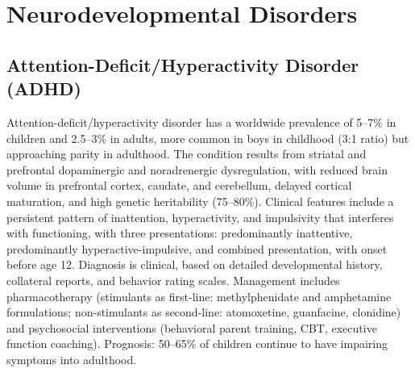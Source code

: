 \section{Neurodevelopmental Disorders}








\label{sec:Neurodevelopmental Disorders}

\subsection{Attention-Deficit/Hyperactivity Disorder (ADHD)}
\label{sec:Attention-Deficit/Hyperactivity Disorder (ADHD)}
Attention-deficit/hyperactivity disorder has a worldwide prevalence of 5--7\% in children and 2.5--3\% in adults, more common in boys in childhood (3:1 ratio) but approaching parity in adulthood. The condition results from striatal and prefrontal dopaminergic and noradrenergic dysregulation, with reduced brain volume in prefrontal cortex, caudate, and cerebellum, delayed cortical maturation, and high genetic heritability (75--80\%). Clinical features include a persistent pattern of inattention, hyperactivity, and impulsivity that interferes with functioning, with three presentations: predominantly inattentive, predominantly hyperactive-impulsive, and combined presentation, with onset before age 12. Diagnosis is clinical, based on detailed developmental history, collateral reports, and behavior rating scales. Management includes pharmacotherapy (stimulants as first-line: methylphenidate and amphetamine formulations; non-stimulants as second-line: atomoxetine, guanfacine, clonidine) and psychosocial interventions (behavioral parent training, CBT, executive function coaching). Prognosis: 50--65\% of children continue to have impairing symptoms into adulthood.

